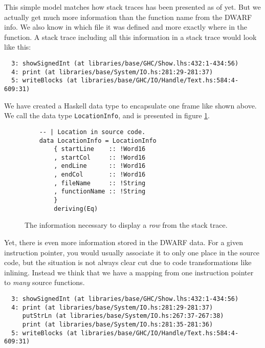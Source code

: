 This simple model matches how stack traces has been presented as of
yet. But we actually get much more information than the function name
from the DWARF info. We also know in which file it was defined and more
exactly where in the function. A stack trace including all this
information in a stack trace would look like this:

\begin{verbatim}
  3: showSignedInt (at libraries/base/GHC/Show.lhs:432:1-434:56)
  4: print (at libraries/base/System/IO.hs:281:29-281:37)
  5: writeBlocks (at libraries/base/GHC/IO/Handle/Text.hs:584:4-609:31)
\end{verbatim}

We have created a Haskell data type to encapsulate one frame like shown
above. We call the data type \texttt{LocationInfo}, and is presented in
figure \ref{fig:location_info}.

\begin{figure}
\begin{mdframed}
  \begin{verbatim}
    -- | Location in source code.
    data LocationInfo = LocationInfo
        { startLine    :: !Word16
        , startCol     :: !Word16
        , endLine      :: !Word16
        , endCol       :: !Word16
        , fileName     :: !String
        , functionName :: !String
        }
        deriving(Eq)
  \end{verbatim}
  \caption{The information necessary to display a \emph{row} from the stack
    trace.}
  \label{fig:location_info}
\end{mdframed}
\end{figure}

Yet, there is even more information stored in the DWARF data. For a
given instruction pointer, you would usually associate it to only one
place in the source code, but the situation is not always clear cut due
to code transformations like inlining. Instead we think that we have a
mapping from one instruction pointer to \emph{many} source functions.

\begin{verbatim}
  3: showSignedInt (at libraries/base/GHC/Show.lhs:432:1-434:56)
  4: print (at libraries/base/System/IO.hs:281:29-281:37)
     putStrLn (at libraries/base/System/IO.hs:267:37-267:38)
     print (at libraries/base/System/IO.hs:281:35-281:36)
  5: writeBlocks (at libraries/base/GHC/IO/Handle/Text.hs:584:4-609:31)
\end{verbatim}

